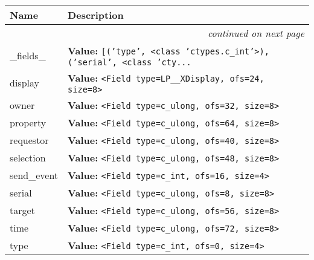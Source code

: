     \vspace{-1cm}
\hspace{\varindent}\begin{longtable}{|p{\varnamewidth}|p{\vardescrwidth}|l}
\cline{1-2}
\cline{1-2} \centering \textbf{Name} & \centering \textbf{Description}& \\
\cline{1-2}
\endhead\cline{1-2}\multicolumn{3}{r}{\small\textit{continued on next page}}\\\endfoot\cline{1-2}
\endlastfoot\raggedright \_\-f\-i\-e\-l\-d\-s\-\_\- & \raggedright \textbf{Value:} 
{\tt \texttt{[}\texttt{(}\texttt{'}\texttt{type}\texttt{'}\texttt{, }{\textless}class 'ctypes.c\_int'{\textgreater}\texttt{)}\texttt{, }\texttt{(}\texttt{'}\texttt{serial}\texttt{'}\texttt{, }{\textless}class 'cty\texttt{...}}&\\
\cline{1-2}
\raggedright d\-i\-s\-p\-l\-a\-y\- & \raggedright \textbf{Value:} 
{\tt {\textless}Field type=LP\_\_XDisplay, ofs=24, size=8{\textgreater}}&\\
\cline{1-2}
\raggedright o\-w\-n\-e\-r\- & \raggedright \textbf{Value:} 
{\tt {\textless}Field type=c\_ulong, ofs=32, size=8{\textgreater}}&\\
\cline{1-2}
\raggedright p\-r\-o\-p\-e\-r\-t\-y\- & \raggedright \textbf{Value:} 
{\tt {\textless}Field type=c\_ulong, ofs=64, size=8{\textgreater}}&\\
\cline{1-2}
\raggedright r\-e\-q\-u\-e\-s\-t\-o\-r\- & \raggedright \textbf{Value:} 
{\tt {\textless}Field type=c\_ulong, ofs=40, size=8{\textgreater}}&\\
\cline{1-2}
\raggedright s\-e\-l\-e\-c\-t\-i\-o\-n\- & \raggedright \textbf{Value:} 
{\tt {\textless}Field type=c\_ulong, ofs=48, size=8{\textgreater}}&\\
\cline{1-2}
\raggedright s\-e\-n\-d\-\_\-e\-v\-e\-n\-t\- & \raggedright \textbf{Value:} 
{\tt {\textless}Field type=c\_int, ofs=16, size=4{\textgreater}}&\\
\cline{1-2}
\raggedright s\-e\-r\-i\-a\-l\- & \raggedright \textbf{Value:} 
{\tt {\textless}Field type=c\_ulong, ofs=8, size=8{\textgreater}}&\\
\cline{1-2}
\raggedright t\-a\-r\-g\-e\-t\- & \raggedright \textbf{Value:} 
{\tt {\textless}Field type=c\_ulong, ofs=56, size=8{\textgreater}}&\\
\cline{1-2}
\raggedright t\-i\-m\-e\- & \raggedright \textbf{Value:} 
{\tt {\textless}Field type=c\_ulong, ofs=72, size=8{\textgreater}}&\\
\cline{1-2}
\raggedright t\-y\-p\-e\- & \raggedright \textbf{Value:} 
{\tt {\textless}Field type=c\_int, ofs=0, size=4{\textgreater}}&\\
\cline{1-2}
\end{longtable}

